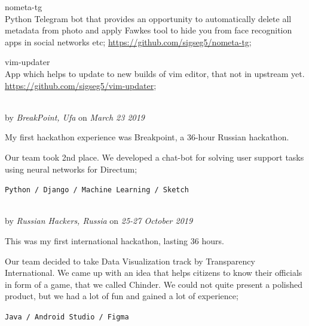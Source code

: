 \Sep


\begin{multicols}{2}
	\begin{compactitem}[\color{Cyan}$\circ$]
		\item\footnotesize nometa-tg \\
		\footnotesize{Python Telegram bot that provides an opportunity to automatically delete all metadata from photo and apply Fawkes tool to hide you from face recognition apps in social networks etc;}
		\tiny \url{https://github.com/sigseg5/nometa-tg};
		\vfill\columnbreak
		
		\item\footnotesize vim-updater \\
		\footnotesize{App which helps to update to new builds of vim editor, that not in upstream yet.}
		\tiny \url{https://github.com/sigseg5/vim-updater};	
	\end{compactitem}
\end{multicols}

\Sep




 \\
by \textit{BreakPoint, Ufa}
on \textit{March 23 2019}
\SmallSep

My first hackathon experience was Breakpoint, a 36-hour Russian hackathon.

Our team took 2nd place. We developed a chat-bot for solving user support tasks using neural networks for Directum;
\SmallSep

\texttt{Python / Django / Machine Learning / Sketch}

\SmallSep

 \\
by \textit{Russian Hackers, Russia}
on \textit{25-27 October 2019}
\SmallSep

This was my first international hackathon, lasting 36 hours.

Our team decided to take Data Visualization track by Transparency International. We came up with an idea that helps citizens to know their officials in form of a game, that we called Chinder. 
We could not quite present a polished product, but we had a lot of fun and gained a lot of experience;

\texttt{Java / Android Studio / Figma}

\SmallSep


